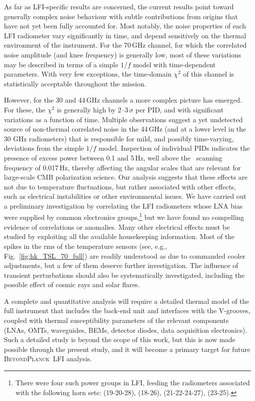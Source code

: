 \documentclass[twocolumn]{aa}
\newcommand{\BP}{\textsc{BeyondPlanck}}
\begin{document}
As far as LFI-specific results are concerned, the current results
point toward generally complex noise behaviour with subtle
contributions from origins that have not yet been fully accounted
for. Most notably, the noise properties of each LFI radiometer vary
significantly in time, and depend sensitively on the thermal
environment of the instrument. For the 70\,GHz channel, for which the
correlated noise amplitude (and knee frequency) is generally low, most
of these variations may be described in terms of a simple $1/f$ model
with time-dependent parameters. With very few exceptions, the
time-domain $\chi^2$ of this channel is statistically acceptable
throughout the mission.

However, for the 30 and 44\,GHz channels a more complex picture has
emerged. For these, the $\chi^2$ is generally high by 2--$3\,\sigma$
per PID, and with significant variations as a function of
time. Multiple observations suggest a yet undetected source of
non-thermal correlated noise in the 44\,GHz (and at a lower level in
the 30 GHz radiometers) that is responsible for mild, and possibly
time-varying, deviations from the simple $1/f$ model. Inspection of
individual PIDs indicates the presence of excess power between 0.1 and
5\,Hz, well above the \Planck\ scanning frequency of 0.017\,Hz,
thereby affecting the angular scales that are relevant for large-scale
CMB polarization science. Our analysis suggests that these effects are
not due to temperature fluctuations, but rather associated with other
effects, such as electrical instabilities or other environmental
issues. We have carried out a preliminary investigation by correlating
the LFI radiometers whose LNA bias were supplied by common electronics
groups,\footnote{There were four such power groups in LFI, feeding the
  radiometers associated with the following horn sets: (19-20-28),
  (18-26), (21-22-24-27), (23-25).}  but we have found no compelling
evidence of correlations or anomalies.  Many other electrical effects
must be studied by exploiting all the available housekeeping
information.  Most of the spikes in the rms of the temperature sensors
(see, e.g., Fig.~\ref{fig:hk_TSL_70_full}) are readily understood as
due to commanded cooler adjustments, but a few of them deserve further
investigation. The influence of transient perturbations should also be
systematically investigated, including the possible effect of cosmic
rays and solar flares.

A complete and quantitative analysis will require a detailed thermal
model of the full instrument that includes the back-end unit and
interfaces with the V-grooves, coupled with thermal susceptibility
parameters of the relevant components (LNAs, OMTs, waveguides, BEMs,
detector diodes, data acquisition electronics). Such a detailed study is beyond the
scope of this work, but this is now made possible through the present
study, and it will become a primary target for future \BP\ LFI
analysis.
\end{document}
